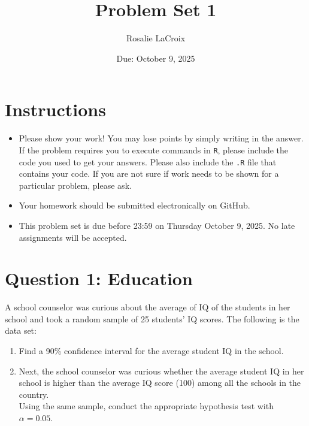 \documentclass[12pt,letterpaper]{article}
\title{Problem Set 1}
\date{Due: October 9, 2025}
\author{Rosalie LaCroix}
\begin{document}
	\maketitle
	
	\section*{Instructions}
	\begin{itemize}
	\item Please show your work! You may lose points by simply writing in the answer. If the problem requires you to execute commands in \texttt{R}, please include the code you used to get your answers. Please also include the \texttt{.R} file that contains your code. If you are not sure if work needs to be shown for a particular problem, please ask.
\item Your homework should be submitted electronically on GitHub.
\item This problem set is due before 23:59 on Thursday October 9, 2025. No late assignments will be accepted.
	\end{itemize}
	
	\vspace{1cm}
	\section*{Question 1: Education}

A school counselor was curious about the average of IQ of the students in her school and took a random sample of 25 students' IQ scores. The following is the data set:\\
\vspace{.5cm}

  

\vspace{1cm}

\begin{enumerate}
	\item Find a 90\% confidence interval for the average student IQ in the school.\\

	
	\item Next, the school counselor was curious  whether  the average student IQ in her school is higher than the average IQ score (100) among all the schools in the country.\\ 
	
	\noindent Using the same sample, conduct the appropriate hypothesis test with $\alpha=0.05$.
	
	
\end{enumerate}
\end{document}
